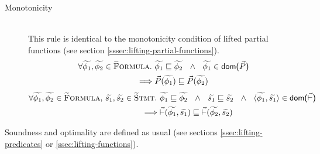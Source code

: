 \begin{description}
    \item[Monotonicity]~\\
    This rule is identical to the monotonicity condition of lifted partial functions (see section \ref{sssec:lifting-partial-functions}). %
    \begin{align*}
    \forall \widetilde{\phi_1}, \widetilde{\phi_2} \in \textup{\textsc{\ensuremath{\widetilde{\text{F}}}ormula}}.~ 
    &\widetilde{\phi_1} \sqsubseteq \widetilde{\phi_2} ~~\wedge~~ \widetilde{\phi_1} \in \textup{\textmd{\textsf{dom($\vec{P}$)}}} \\
    \implies 
    &\vec{P}(\widetilde{\phi_1}) \sqsubseteq \vec{P}(\widetilde{\phi_2})
    \end{align*}
    \textcolor{blue}{
        \begin{align*}
        \forall \widetilde{\phi_1}, \widetilde{\phi_2} \in \textup{\textsc{\ensuremath{\widetilde{\text{F}}}ormula}},\, \widetilde{s_1}, \widetilde{s_2} \in \textup{\textsc{\ensuremath{\widetilde{\text{S}}}tmt}}.~ 
        &\widetilde{\phi_1} \sqsubseteq \widetilde{\phi_2} ~~\wedge~~ \widetilde{s_1} \sqsubseteq \widetilde{s_2} ~~\wedge~~ \langle \widetilde{\phi_1}, \widetilde{s_1} \rangle \in \textup{\textmd{\textsf{dom($\vec{\vdash}$)}}}\\
        \implies 
        &\vec{\vdash}(\widetilde{\phi_1}, \widetilde{s_1}) \sqsubseteq \vec{\vdash}(\widetilde{\phi_2}, \widetilde{s_2})
        \end{align*}
    }
\end{description}

Soundness and optimality are defined as usual (see sections \ref{ssec:lifting-predicates} or \ref{ssec:lifting-functions}).


